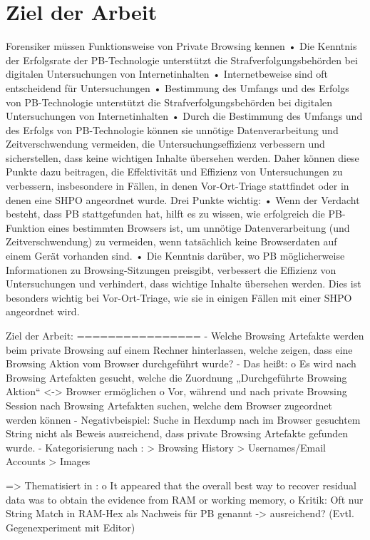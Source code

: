 \chapter{Ziel der Arbeit}

Forensiker müssen Funktionsweise von Private Browsing kennen \cite{Horsman.2019}
	•	Die Kenntnis der Erfolgsrate der PB-Technologie unterstützt die Strafverfolgungsbehörden bei digitalen Untersuchungen von Internetinhalten
	•	Internetbeweise sind oft entscheidend für Untersuchungen
	•	Bestimmung des Umfangs und des Erfolgs von PB-Technologie unterstützt die Strafverfolgungsbehörden bei digitalen Untersuchungen von Internetinhalten
	•	Durch die Bestimmung des Umfangs und des Erfolgs von PB-Technologie können sie unnötige Datenverarbeitung und Zeitverschwendung vermeiden, die Untersuchungseffizienz verbessern und sicherstellen, dass keine wichtigen Inhalte übersehen werden. Daher können diese Punkte dazu beitragen, die Effektivität und Effizienz von Untersuchungen zu verbessern, insbesondere in Fällen, in denen Vor-Ort-Triage stattfindet oder in denen eine SHPO angeordnet wurde. Drei Punkte wichtig:
	•	Wenn der Verdacht besteht, dass PB stattgefunden hat, hilft es zu wissen, wie erfolgreich die PB-Funktion eines bestimmten Browsers ist, um unnötige Datenverarbeitung (und Zeitverschwendung) zu vermeiden, wenn tatsächlich keine Browserdaten auf einem Gerät vorhanden sind.
	•	Die Kenntnis darüber, wo PB möglicherweise Informationen zu Browsing-Sitzungen preisgibt, verbessert die Effizienz von Untersuchungen und verhindert, dass wichtige Inhalte übersehen werden. Dies ist besonders wichtig bei Vor-Ort-Triage, wie sie in einigen Fällen mit einer SHPO angeordnet wird.
	


Ziel der Arbeit:
================
-	Welche Browsing Artefakte werden beim private Browsing auf einem Rechner hinterlassen, welche zeigen, dass eine Browsing Aktion vom Browser durchgeführt wurde?
-	Das heißt: 
	o	Es wird nach Browsing Artefakten gesucht, welche die Zuordnung „Durchgeführte Browsing Aktion“ <-> Browser ermöglichen
	o	Vor, während und nach private Browsing Session nach Browsing Artefakten suchen, welche dem Browser zugeordnet werden können
-	Negativbeispiel: Suche in Hexdump nach im Browser gesuchtem String nicht als Beweis ausreichend, dass private Browsing Artefakte gefunden wurde.
- Kategorisierung nach \cite{Ohana.2013}: 
	> Browsing History
	> Usernames/Email Accounts
	> Images

=> Thematisiert in \cite{Ohana.2013}:
	o	It appeared that the overall best way to recover residual data was to obtain the evidence from RAM or working memory,
	o	Kritik: Oft nur String Match in RAM-Hex als Nachweis für PB genannt -> ausreichend? (Evtl. Gegenexperiment mit Editor)


